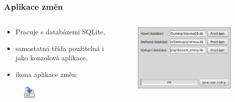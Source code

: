\documentclass{beamer}
\begin{document}
\begin{frame}
\frametitle{Aplikace změn}

\begin{columns}%

  \begin{column}{0.5\textwidth}

    \begin{itemize}
      \item Pracuje s databázemi SQLite,
      \item samostatná třída použitelná i jako konzolová aplikace,
      \item ikona aplikace změn:
    \end{itemize}
    
    \begin{figure}
      \includegraphics[scale=.8]{images/zmeny_ikona.png}
    \end{figure}
  
  \end{column}
  
  \begin{column}{0.5\textwidth}
  
    \begin{figure}
      \includegraphics[width=.9\textwidth]{images/vfkPlugin-zmeny.png}
    \end{figure}
    
  \end{column}

\end{columns}

\end{frame}
\end{document}
